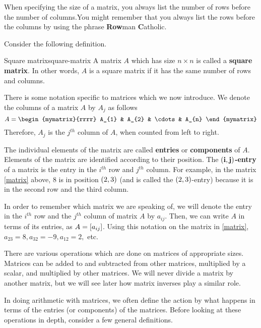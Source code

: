 When specifying the size of a matrix, you always list the number
of rows before the number of columns.You
might remember that you always list the rows before the columns by using the
phrase \textbf{Row}man \textbf{C}atholic. 

Consider the following definition.

\begin{definition}{Square matrix}{square-matrix}
A matrix $A$ which has size $n \times n$ is called a \textbf{square matrix}.
In other words, $A$ is a square matrix if it has the same number of rows
and columns.
\end{definition}

There is some notation specific to matrices which we now introduce. We denote the columns of a matrix $A$ 
by $A_{j}$ as follows
\begin{equation*}
A = 
\begin{mymatrix}{rrrr}
A_{1} & A_{2} & \cdots & A_{n}
\end{mymatrix}
\end{equation*}
Therefore, $A_{j}$ is the $j^{th}$ column of $A$, when counted from left to right. 

The individual elements of the matrix are called \textbf{entries} or \textbf{components} of $A$. Elements of the matrix
are identified according to their position. The $\mathbf{\left(i, j \right)}$\textbf{-entry} of a matrix is the entry 
in the $i^{th}$ row and $j^{th}$ column. For example, in the matrix \ref{matrix} above,  $8$ is in
position $\left(2,3 \right)$ (and is called the $\left(2,3 \right)$-entry) because it is in the second row and the third column. 

In order to remember which matrix we are speaking of, we 
will denote the entry in the $i^{th}$ row  and the $j^{th}$ column of matrix $A$ by $a_{ij}$. Then, we can write $A$ in terms of its entries,
as $A= \left[a_{ij} \right]$. Using this notation on the matrix in \ref{matrix},
$a_{23}=8, a_{32}=-9, a_{12}=2,$ etc.

There are various operations which are done on matrices of appropriate
sizes. Matrices can be added to and subtracted from other matrices,
multiplied by a scalar, and multiplied by other matrices. We will
never divide a matrix by another matrix, but we will see later how matrix inverses play a similar role. 

In doing arithmetic with matrices, we often define the action by what
happens in terms of the entries (or components) of the
matrices. Before looking at these operations in depth, consider a few
general definitions.

